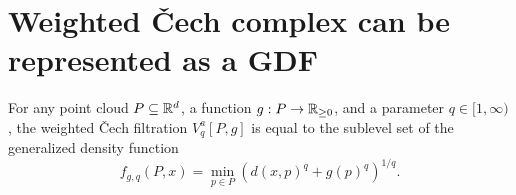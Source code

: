 \chapter{Weighted \v{C}ech complex can be represented as a GDF}
\label{app:weighted_cech}

\begin{lemma}
    For any point cloud $P \subseteq \mathbb{R}^d$, a function $g : P \to \mathbb{R}_{\geq 0}$, and a
    parameter $q \in [1, \infty)$, the weighted \v{C}ech filtration
    $V^a_q[P, g]$ is equal to the sublevel set of the generalized density
    function
    \begin{equation}
        f_{g, q}(P, x) = \min_{p \in P} (d(x, p)^q + g(p)^q)^{1/q}.
    \end{equation}
\end{lemma}

